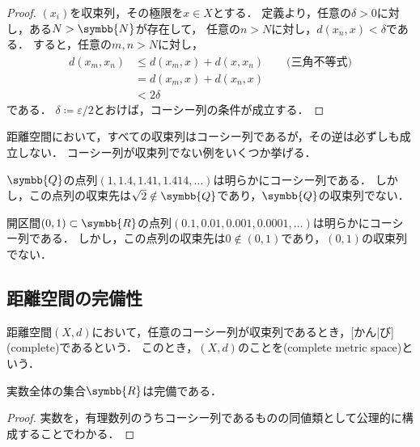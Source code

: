 \documentclass[../sotsu.tex]{subfiles}
\begin{document}
\begin{proof}
    $(x_i)$を収束列，その極限を$x \in X$とする．
    定義より，任意の$\delta > 0$に対し，ある$N > \symbb{N}$が存在して，
    任意の$n > N$に対し，$d(x_n, x) < \delta$である．
    すると，任意の$m, n > N$に対し，
    \begin{equation*}
        \begin{split}
            d(x_m, x_n) &\leq d(x_m, x) + d(x, x_n)  \qquad \text{(三角不等式)}  \\
                &= d(x_m, x) + d(x_n, x)  \\
                &< 2\delta
        \end{split}
    \end{equation*}
    である．
    $\delta \coloneq \varepsilon/2$とおけば，コーシー列の条件が成立する．
\end{proof}

距離空間において，すべての収束列はコーシー列であるが，その逆は必ずしも成立しない．
コーシー列が収束列でない例をいくつか挙げる．

\begin{example}
    $\symbb{Q}$の点列$(1, 1.4, 1.41, 1.414, \dotsc)$は明らかにコーシー列である．
    しかし，この点列の収束先は$\sqrt{2} \notin \symbb{Q}$であり，$\symbb{Q}$の収束列でない．
\end{example}

\begin{example}
    開区間$(0, 1) \subset \symbb{R}$の点列$(0.1, 0.01, 0.001, 0.0001, \dotsc)$は明らかにコーシー列である．
    しかし，この点列の収束先は$0 \notin (0, 1)$であり，$(0, 1)$の収束列でない．
\end{example}


\subsection{距離空間の完備性}

\begin{definition}
    距離空間$(X, d)$において，任意のコーシー列が収束列であるとき，[かん|び](complete)であるという．
    このとき，$(X, d)$のことを(complete metric space)という．
\end{definition}

\begin{proposition}[実数の完備性]
    実数全体の集合$\symbb{R}$は完備である．
\end{proposition}

\begin{proof}
    実数を，有理数列のうちコーシー列であるものの同値類として公理的に構成することでわかる．
\end{proof}
\end{document}
